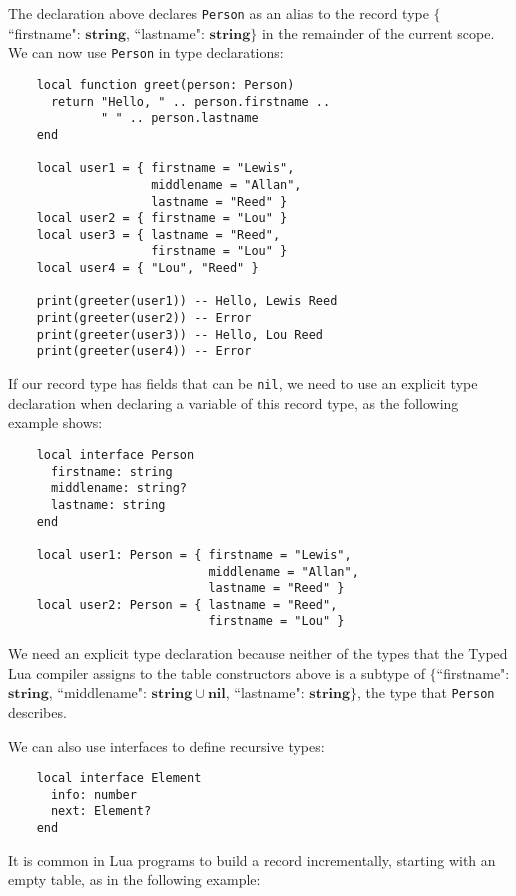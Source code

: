 \documentclass[preprint]{sig-alternate}
\newcommand{\Nil}{\mathbf{nil}}
\newcommand{\String}{\mathbf{string}}
\begin{document}
The declaration above declares {\tt Person} as an alias to
the record type $\{$``firstname": $\String$,
 ``lastname": $\String\}$ in
the remainder of the current scope. We can now use {\tt Person} in
type declarations:

\begin{verbatim}
    local function greet(person: Person)
      return "Hello, " .. person.firstname ..
             " " .. person.lastname
    end

    local user1 = { firstname = "Lewis",
                    middlename = "Allan",
                    lastname = "Reed" }
    local user2 = { firstname = "Lou" }
    local user3 = { lastname = "Reed",
                    firstname = "Lou" }
    local user4 = { "Lou", "Reed" }

    print(greeter(user1)) -- Hello, Lewis Reed
    print(greeter(user2)) -- Error
    print(greeter(user3)) -- Hello, Lou Reed
    print(greeter(user4)) -- Error
\end{verbatim}

If our record type has fields that can be {\tt nil}, we need
to use an explicit type declaration when declaring a
variable of this record type, as the following example shows:

\begin{verbatim}
    local interface Person
      firstname: string
      middlename: string?
      lastname: string
    end

    local user1: Person = { firstname = "Lewis",
                            middlename = "Allan",
                            lastname = "Reed" }
    local user2: Person = { lastname = "Reed",
                            firstname = "Lou" }
\end{verbatim}

We need an explicit type declaration because neither of
the types that the Typed Lua compiler assigns to the
table constructors above is a subtype of $\{$``firstname":
$\String$, ``middlename": $\String \cup \Nil$, ``lastname":
$\String\}$, the type that {\tt Person} describes.

We can also use interfaces to define recursive types:

\begin{verbatim}
    local interface Element
      info: number
      next: Element?
    end
\end{verbatim}

It is common in Lua programs to build a record incrementally,
starting with an empty table, as in the following example:
\end{document}
